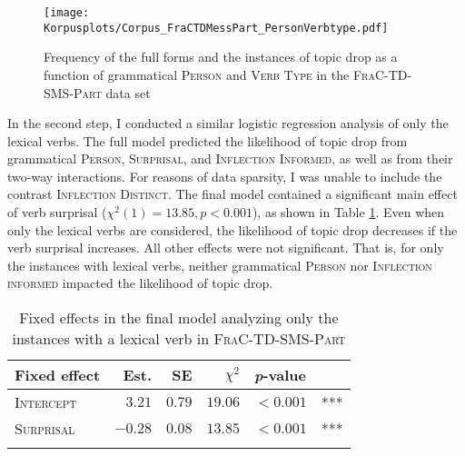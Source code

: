 \begin{figure}
\centering
\texttt{[image: Korpusplots/Corpus\_FraCTDMessPart\_PersonVerbtype.pdf]}
\caption{Frequency of the full forms and the instances of topic drop as a function of grammatical \textsc{Person} and \textsc{Verb Type} in the \textsc{FraC-TD-SMS-Part} data set}
\label{fig:frac.corpus.plot.freq.person.verbtype}
\end{figure}

\noindent
In the second step, I conducted a similar logistic regression analysis of only the lexical verbs.
The full model predicted the likelihood of topic drop from grammatical \textsc{Person}, \textsc{Surprisal}, and \textsc{Inflection Informed}, as well as from their two-way interactions.
For reasons of data sparsity, I was unable to include the contrast \textsc{Inflection Distinct}.
The final model contained a significant main effect of verb surprisal ($\chi^2(1) = 13.85, p < 0.001$), as shown in Table \ref{tab:frac.mess.part.model.2}.
Even when only the lexical verbs are considered, the likelihood of topic drop decreases if the verb surprisal increases.
All other effects were not significant.
That is, for only the instances with lexical verbs, neither grammatical \textsc{Person} nor \textsc{Inflection informed} impacted the likelihood of topic drop.

\begin{table}
\centering
\caption{Fixed effects in the final model analyzing only the instances with a lexical verb in \textsc{FraC-TD-SMS-Part}}
\begin{tabular}{lrrrll}
\lsptoprule
Fixed effect & Est. & SE & $\chi^2$ & \textit{p}-value &   \\
\midrule
\textsc{Intercept} & $3.21$ & $0.79$ & $19.06$ & $< 0.001$ & ***\\
\textsc{Surprisal} & $-0.28$ & $0.08$ & $13.85$ & $< 0.001$ & ***\\
\lspbottomrule
\end{tabular}
\label{tab:frac.mess.part.model.2}
\end{table}

